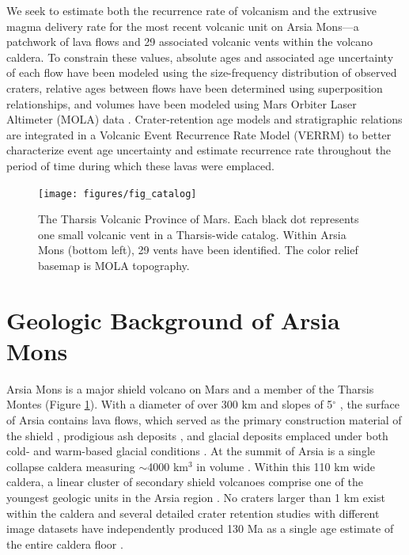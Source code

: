 \documentclass[12pt,letter]{article}
\begin{document}
We seek to estimate both the recurrence rate of volcanism and the extrusive magma delivery rate for the most recent volcanic unit on Arsia Mons---a patchwork of lava flows and 29 associated volcanic vents within the volcano caldera. To constrain these values, absolute ages and associated age uncertainty of each flow have been modeled using the size-frequency distribution of observed craters, relative ages between flows have been determined using superposition relationships, and volumes have been modeled using Mars Orbiter Laser Altimeter (MOLA) data \citep{smith2003mars}. Crater-retention age models and stratigraphic relations are integrated in a Volcanic Event Recurrence Rate Model (VERRM) to better characterize event age uncertainty and estimate recurrence rate throughout the period of time during which these lavas were emplaced.

\begin{figure}
\centering
\texttt{[image: figures/fig\_catalog]}
\caption{The Tharsis Volcanic Province of Mars. Each black dot represents one small volcanic vent in a Tharsis-wide catalog. Within Arsia Mons (bottom left), 29 vents have been identified. The color relief basemap is MOLA topography.}
\label{fig_locatormap}
\end{figure}

\section{Geologic Background of Arsia Mons}

Arsia Mons is a major shield volcano on Mars and a member of the Tharsis Montes (Figure \ref{fig_locatormap}). With a diameter of over 300 km and slopes of 5$^{\circ}$ \citep{plescia2004morphometric}, the surface of Arsia contains lava flows, which served as the primary construction material of the shield \citep{mouginis2008lava}, prodigious ash deposits \citep{mouginis2002prodigious}, and glacial deposits \citep{head2003cold} emplaced under both cold- and warm-based glacial conditions \citep{scanlon2015volcanism}. At the summit of Arsia is a single collapse caldera measuring $\sim$4000 km$^3$ in volume \citep{wilson2001evidence}. Within this 110 km wide caldera, a linear cluster of secondary shield volcanoes comprise one of the youngest geologic units in the Arsia region \citep{carr1977some,scott1995geologic}. No craters larger than 1 km exist within the caldera and several detailed crater retention studies with different image datasets have independently produced 130 Ma as a single age estimate of the entire caldera floor \citep{neukum2004recent,werner2009global,robbins2011volcanic}.
\end{document}

